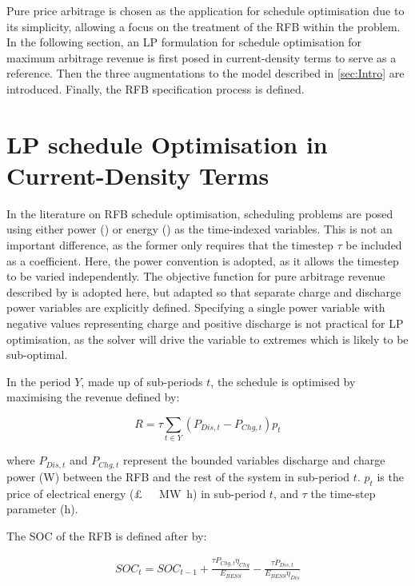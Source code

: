 \documentclass[preprint,3p,review,authoryear,10pt]{elsarticle}
\begin{document}
Pure price arbitrage is chosen as the application for schedule optimisation due to its simplicity, allowing a focus on the treatment of the RFB within the problem. In the following section, an LP formulation for schedule optimisation for maximum arbitrage revenue is first posed in current-density terms to serve as a reference. Then the three augmentations to the model described in \cref{sec:Intro} are introduced. Finally, the RFB specification process is defined.

\section{LP schedule Optimisation in Current-Density Terms}
\label{Model_Formulation_LP_Reference_Current_Density_Terms}

In the literature on RFB schedule optimisation, scheduling problems are posed using either power (\cite{Chen2012,Hu2010,Nguyen2015}) or energy (\cite{Johnston2015,Vaca2017}) as the time-indexed variables. This is not an important difference, as the former only requires that the timestep $\tau$ be included as a coefficient. Here, the power convention is adopted, as it allows the timestep to be varied independently. The objective function for pure arbitrage revenue described by \cite{Hu2010} is adopted here, but adapted so that separate charge and discharge power variables are explicitly defined. Specifying a single power variable with negative values representing charge and positive discharge is not practical for LP optimisation, as the solver will drive the variable to extremes which is likely to be sub-optimal.

In the period $Y$, made up of sub-periods $t$, the schedule is optimised by maximising the revenue defined by:

\begin{equation}
\label{eqn:Lit_Review_LP_Obj_Func}
R = \tau \sum_{t \in Y} (P_{Dis,t} - P_{Chg,t}) p_t
\end{equation}

where $P_{Dis,t}$ and $P_{Chg,t}$ represent the bounded variables discharge and charge power (\si{\watt}) between the RFB and the rest of the system in sub-period $t$. $p_t$ is the price of electrical energy (\SI[sticky-per, bracket-unit-denominator = false]{}[\pounds]{\per\mega\watt\hour}) in sub-period $t$, and $\tau$ the time-step parameter  (\si{\hour}). 

The SOC of the RFB is defined after \cite{Gomes2017} by:

\begin{equation}
\label{eqn: Lit_Review_LP_SOC_Constraint_Example}
\begin{gathered}
SOC_t = SOC_{t-1} + \frac{\tau P_{Chg,t} \eta_{Chg}}{E_{BESS}} - \frac{\tau P_{Dis,t}}{E_{BESS}\eta_{Dis}} \\
\end{gathered}
\end{equation}
\end{document}
